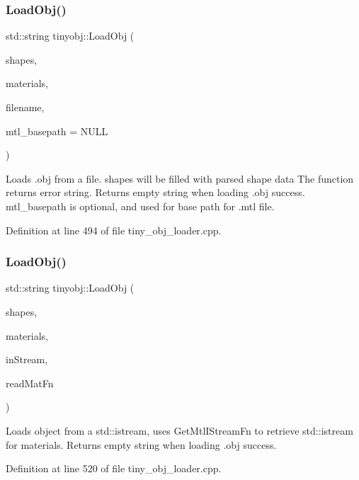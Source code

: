 \subsubsection{\texorpdfstring{Load\+Obj()}{LoadObj()}\hspace{0.1cm}{\footnotesize\ttfamily [1/2]}}
{\footnotesize\ttfamily std\+::string tinyobj\+::\+Load\+Obj (\begin{DoxyParamCaption}\item[{std\+::vector$<$ \hyperlink{structtinyobj_1_1shape__t}{shape\+\_\+t} $>$ \&}]{shapes,  }\item[{std\+::vector$<$ \hyperlink{structtinyobj_1_1material__t}{material\+\_\+t} $>$ \&}]{materials,  }\item[{const char $\ast$}]{filename,  }\item[{const char $\ast$}]{mtl\+\_\+basepath = {\ttfamily NULL} }\end{DoxyParamCaption})}

Loads .obj from a file. \textquotesingle{}shapes\textquotesingle{} will be filled with parsed shape data The function returns error string. Returns empty string when loading .obj success. \textquotesingle{}mtl\+\_\+basepath\textquotesingle{} is optional, and used for base path for .mtl file. 

Definition at line 494 of file tiny\+\_\+obj\+\_\+loader.\+cpp.

\mbox{\label{namespacetinyobj_acb20cdb095743e069eac27c0b95d32b8}} 
\subsubsection{\texorpdfstring{Load\+Obj()}{LoadObj()}\hspace{0.1cm}{\footnotesize\ttfamily [2/2]}}
{\footnotesize\ttfamily std\+::string tinyobj\+::\+Load\+Obj (\begin{DoxyParamCaption}\item[{std\+::vector$<$ \hyperlink{structtinyobj_1_1shape__t}{shape\+\_\+t} $>$ \&}]{shapes,  }\item[{std\+::vector$<$ \hyperlink{structtinyobj_1_1material__t}{material\+\_\+t} $>$ \&}]{materials,  }\item[{std\+::istream \&}]{in\+Stream,  }\item[{\hyperlink{classtinyobj_1_1_material_reader}{Material\+Reader} \&}]{read\+Mat\+Fn }\end{DoxyParamCaption})}

Loads object from a std\+::istream, uses Get\+Mtl\+I\+Stream\+Fn to retrieve std\+::istream for materials. Returns empty string when loading .obj success. 

Definition at line 520 of file tiny\+\_\+obj\+\_\+loader.\+cpp.

